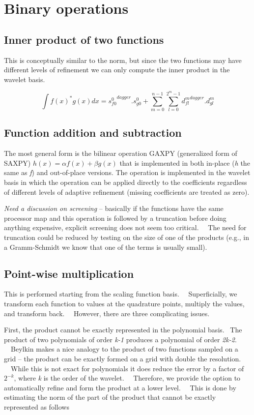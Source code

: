 \documentclass[letterpaper]{article}
\begin{document}
\section[Binary operations]{\rmfamily Binary operations}
\subsection[Inner product of two functions]{\rmfamily Inner product of two functions}
This is conceptually similar to the norm, but since the two functions may have different levels of refinement we can
only compute the inner product in the wavelet basis. \ 

\begin{equation}
\int f(x)^{\text{*}}g(x)dx=\left.s_{f0}^{0}\right.^{dagger}.s_{g0}^{0}+\sum _{m=0}^{n-1}\sum
_{l=0}^{2^{m}-1}\left.d_{fl}^{m}\right.^{dagger}.d_{gl}^{m}
\end{equation}
\subsection[Function addition and subtraction]{\rmfamily Function addition and subtraction}
The most general form is the bilinear operation GAXPY (generalized form of SAXPY)  $h(x)=\alpha f(x)+\beta g(x)$ that is
implemented in both in-place (\textit{h} the same as \textit{f}) and out-of-place versions. The operation is
implemented in the wavelet basis in which the operation can be applied directly to the coefficients regardless of
different levels of adaptive refinement (missing coefficients are treated as zero).

\textit{Need a discussion on screening} -- basically if the functions have the same processor map and this operation is
followed by a truncation before doing anything expensive, explicit screening does not seem too critical. \ \ The need
for truncation could be reduced by testing on the size of one of the products (e.g., in a Gramm-Schmidt we know that
one of the terms is usually small).

\subsection{Point-wise multiplication}
This is performed starting from the scaling function basis. \ \ Superficially, we transform each function to values at
the quadrature points, multiply the values, and transform back. \ \ However, there are three complicating issues. \ 

First, the product cannot be exactly represented in the polynomial basis. \ The product of two polynomials of order
\textit{k-1} produces a polynomial of order \textit{2k-2}. \ \ Beylkin makes a nice analogy to the product of two
functions sampled on a grid -- the product can be exactly formed on a grid with double the resolution. \ \ While this
is not exact for polynomials it does reduce the error by a factor of  $2^{-k}$, where \textit{k} is the order of the
wavelet. \ \ Therefore, we provide the option to automatically refine and form the product at a lower level. \ \ This
is done by estimating the norm of the part of the product that cannot be exactly represented as follows 
\end{document}
